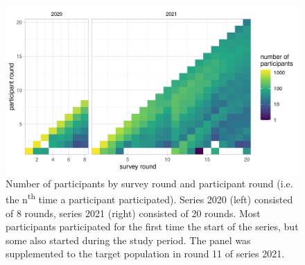 \documentclass[fleqn,10pt]{wlscirep}
\begin{document}
\begin{figure}[ht]
\centering
\includegraphics[width=\linewidth]{../figures/participant_rounds.png}
\caption{Number of participants by survey round and participant round (i.e. the n\textsuperscript{th} time a participant participated). Series 2020 (left) consisted of 8 rounds, series 2021 (right) consisted of 20 rounds. Most participants participated for the first time the start of the series, but some also started during the study period. The panel was supplemented to the target population in round 11 of series 2021.}
\label{fig:part_round}
\end{figure}
\end{document}

